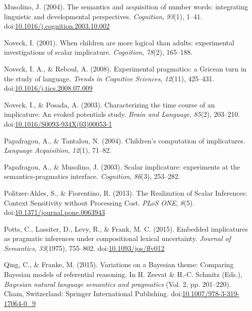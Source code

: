 \documentclass[man]{apa6}
\theoremstyle{definition}
\theoremstyle{definition}
\theoremstyle{definition}
\theoremstyle{remark}
\begin{document}
\hypertarget{ref-Musolino2004}{}
Musolino, J. (2004). The semantics and acquisition of number words:
integrating linguistic and developmental perspectives. \emph{Cognition},
\emph{93}(1), 1--41.
doi:\href{https://doi.org/10.1016/j.cognition.2003.10.002}{10.1016/j.cognition.2003.10.002}

\hypertarget{ref-Noveck2001}{}
Noveck, I. (2001). When children are more logical than adults:
experimental investigations of scalar implicature. \emph{Cognition},
\emph{78}(2), 165--188.

\hypertarget{ref-noveck2008}{}
Noveck, I. A., \& Reboul, A. (2008). Experimental pragmatics: a Gricean
turn in the study of language. \emph{Trends in Cognitive Sciences},
\emph{12}(11), 425--431.
doi:\href{https://doi.org/10.1016/j.tics.2008.07.009}{10.1016/j.tics.2008.07.009}

\hypertarget{ref-Noveck2003}{}
Noveck, I., \& Posada, A. (2003). Characterizing the time course of an
implicature: An evoked potentials study. \emph{Brain and Language},
\emph{85}(2), 203--210.
doi:\href{https://doi.org/10.1016/S0093-934X(03)00053-1}{10.1016/S0093-934X(03)00053-1}

\hypertarget{ref-Papafragou2004}{}
Papafragou, A., \& Tantalou, N. (2004). Children's computation of
implicatures. \emph{Language Acquisition}, \emph{12}(1), 71--82.

\hypertarget{ref-Papafragou2003}{}
Papafragou, A., \& Musolino, J. (2003). Scalar implicature: experiments at the semantics-pragmatics interface. \emph{Cognition}, \emph{86}(3), 253--282.

\hypertarget{ref-Politzer-Ahles2013}{}
Politzer-Ahles, S., \& Fiorentino, R. (2013). The Realization of Scalar
Inferences: Context Sensitivity without Processing Cost. \emph{PLoS
ONE}, \emph{8}(5).
doi:\href{https://doi.org/10.1371/journal.pone.0063943}{10.1371/journal.pone.0063943}

\hypertarget{ref-Potts2015}{}
Potts, C., Lassiter, D., Levy, R., \& Frank, M. C. (2015). Embedded
implicatures as pragmatic inferences under compositional lexical
uncertainty. \emph{Journal of Semantics}, \emph{33}(1975), 755--802.
doi:\href{https://doi.org/10.1093/jos/ffv012}{10.1093/jos/ffv012}

\hypertarget{ref-Qing2015}{}
Qing, C., \& Franke, M. (2015). Variations on a Bayesian theme:
Comparing Bayesian models of referential reasoning. In H. Zeevat \&
H.-C. Schmitz (Eds.), \emph{Bayesian natural language semantics and
pragmatics} (Vol. 2, pp. 201--220). Cham, Switzerland: Springer
International Publishing.
doi:\href{https://doi.org/10.1007/978-3-319-17064-0_9}{10.1007/978-3-319-17064-0\_9}
\end{document}
